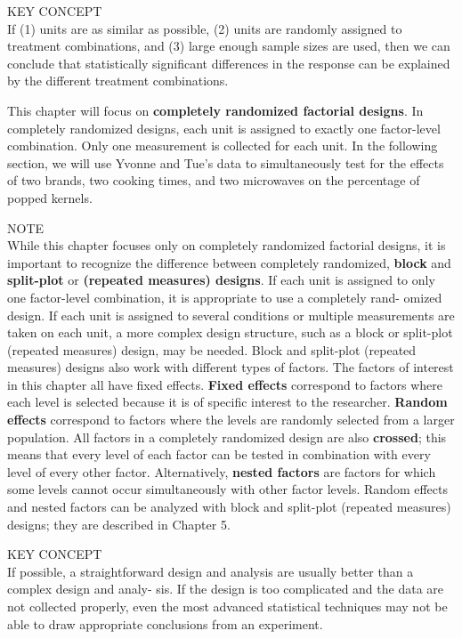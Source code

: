 \documentclass[
]{report}
\begin{document}
KEY CONCEPT\\
If (1) units are as similar as possible, (2) units are randomly assigned to treatment combinations, and
(3) large enough sample sizes are used, then we can conclude that statistically significant differences
in the response can be explained by the different treatment combinations.

This chapter will focus on \textbf{completely randomized factorial designs}. In completely randomized designs,
each unit is assigned to exactly one factor-level combination. Only one measurement is collected for each
unit. In the following section, we will use Yvonne and Tue's data to simultaneously test for the effects of two
brands, two cooking times, and two microwaves on the percentage of popped kernels.

NOTE\\
While this chapter focuses only on completely randomized factorial designs, it is important to recognize
the difference between completely randomized, \textbf{block} and \textbf{split-plot} or \textbf{(repeated measures) designs}.
If each unit is assigned to only one factor-level combination, it is appropriate to use a completely rand-
omized design. If each unit is assigned to several conditions or multiple measurements are taken on each
unit, a more complex design structure, such as a block or split-plot (repeated measures) design, may be
needed.
Block and split-plot (repeated measures) designs also work with different types of factors. The factors
of interest in this chapter all have fixed effects. \textbf{Fixed effects} correspond to factors where each level is
selected because it is of specific interest to the researcher. \textbf{Random effects} correspond to factors where
the levels are randomly selected from a larger population. All factors in a completely randomized design
are also \textbf{crossed}; this means that every level of each factor can be tested in combination with every
level of every other factor. Alternatively, \textbf{nested factors} are factors for which some levels cannot occur
simultaneously with other factor levels. Random effects and nested factors can be analyzed with block
and split-plot (repeated measures) designs; they are described in Chapter 5.

KEY CONCEPT\\
If possible, a straightforward design and analysis are usually better than a complex design and analy-
sis. If the design is too complicated and the data are not collected properly, even the most advanced
statistical techniques may not be able to draw appropriate conclusions from an experiment.
\end{document}
